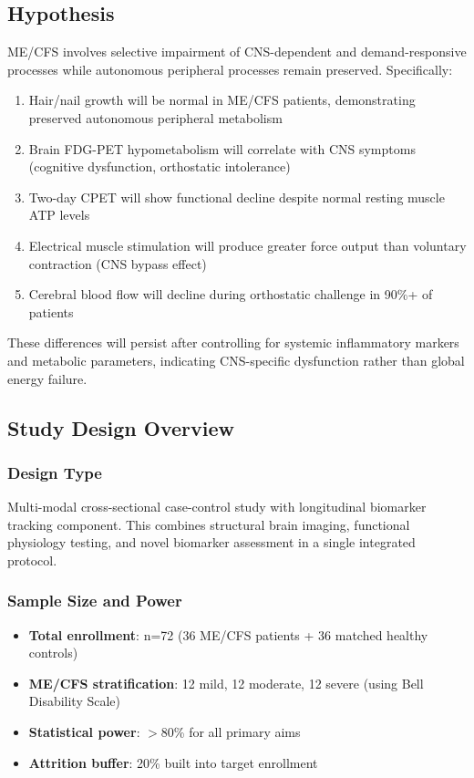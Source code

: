 \subsection{Hypothesis}

\begin{hypothesis}
\label{hyp:selective-energy-dysfunction}
ME/CFS involves selective impairment of CNS-dependent and demand-responsive processes while autonomous peripheral processes remain preserved. Specifically:
\begin{enumerate}
    \item Hair/nail growth will be normal in ME/CFS patients, demonstrating preserved autonomous peripheral metabolism
    \item Brain FDG-PET hypometabolism will correlate with CNS symptoms (cognitive dysfunction, orthostatic intolerance)
    \item Two-day CPET will show functional decline despite normal resting muscle ATP levels
    \item Electrical muscle stimulation will produce greater force output than voluntary contraction (CNS bypass effect)
    \item Cerebral blood flow will decline during orthostatic challenge in 90\%+ of patients
\end{enumerate}
These differences will persist after controlling for systemic inflammatory markers and metabolic parameters, indicating CNS-specific dysfunction rather than global energy failure.
\end{hypothesis}

\subsection{Study Design Overview}

\subsubsection{Design Type}
Multi-modal cross-sectional case-control study with longitudinal biomarker tracking component. This combines structural brain imaging, functional physiology testing, and novel biomarker assessment in a single integrated protocol.

\subsubsection{Sample Size and Power}
\begin{itemize}
    \item \textbf{Total enrollment}: n=72 (36 ME/CFS patients + 36 matched healthy controls)
    \item \textbf{ME/CFS stratification}: 12 mild, 12 moderate, 12 severe (using Bell Disability Scale)
    \item \textbf{Statistical power}: $>$80\% for all primary aims
    \item \textbf{Attrition buffer}: 20\% built into target enrollment
\end{itemize}

